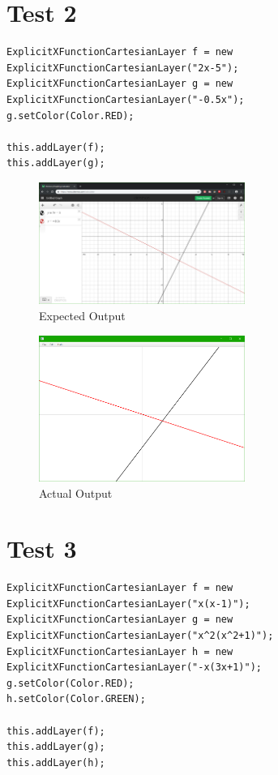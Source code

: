 \documentclass[../../../main.tex]{subfiles}
\begin{document}
\section{Test 2}
\begin{verbatim}
ExplicitXFunctionCartesianLayer f = new ExplicitXFunctionCartesianLayer("2x-5");
ExplicitXFunctionCartesianLayer g = new ExplicitXFunctionCartesianLayer("-0.5x");
g.setColor(Color.RED);

this.addLayer(f);
this.addLayer(g);
\end{verbatim}

\begin{figure}[H]
	\centering
	\includegraphics[width=0.6\textwidth]{tests/expected2}
	\caption{Expected Output}
\end{figure}

\begin{figure}[H]
	\centering
	\includegraphics[width=0.6\textwidth]{tests/actual2}
	\caption{Actual Output}
\end{figure}
\newpage

\section{Test 3}
\begin{verbatim}
ExplicitXFunctionCartesianLayer f = new ExplicitXFunctionCartesianLayer("x(x-1)");
ExplicitXFunctionCartesianLayer g = new ExplicitXFunctionCartesianLayer("x^2(x^2+1)");
ExplicitXFunctionCartesianLayer h = new ExplicitXFunctionCartesianLayer("-x(3x+1)");
g.setColor(Color.RED);
h.setColor(Color.GREEN);

this.addLayer(f);
this.addLayer(g);
this.addLayer(h);
\end{verbatim}
\end{document}
